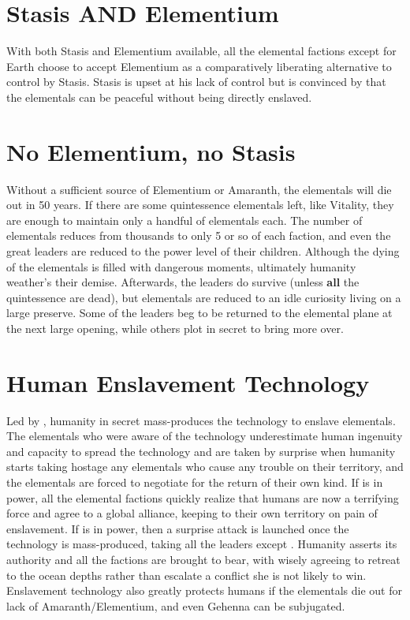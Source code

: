 \documentclass[green]{elementals}
\begin{document}
\section{Stasis AND Elementium}

With both Stasis and Elementium available, all the elemental factions except for Earth choose to accept Elementium as a comparatively liberating alternative to control by Stasis. Stasis is upset at his lack of control but is convinced by \cAvatar{\intro} that the elementals can be peaceful without being directly enslaved.

\section{No Elementium, no Stasis}

Without a sufficient source of Elementium or Amaranth, the elementals will die out in 50 years. If there are some quintessence elementals left, like Vitality, they are enough to maintain only a handful of elementals each. The number of elementals reduces from thousands to only 5 or so of each faction, and even the great leaders are reduced to the power level of their children. Although the dying of the elementals is filled with dangerous moments, ultimately humanity weather's their demise. Afterwards, the leaders do survive (unless \textbf{all} the quintessence are dead), but elementals are reduced to an idle curiosity living on a large preserve. Some of the leaders beg to be returned to the elemental plane at the next large opening, while others plot in secret to bring more over.

\section{Human Enslavement Technology}

Led by \cGD{\intro}, humanity in secret mass-produces the technology to enslave elementals. The elementals who were aware of the technology underestimate human ingenuity and capacity to spread the technology and are taken by surprise when humanity starts taking hostage any elementals who cause any trouble on their territory, and the elementals are forced to negotiate for the return of their own kind. If \cLeader{\intro} is in power, all the elemental factions quickly realize that humans are now a terrifying force and agree to a global alliance, keeping to their own territory on pain of enslavement. If \cDema{\intro} is in power, then a surprise attack is launched once the technology is mass-produced, taking all the leaders except \cWaterQueen{}. Humanity asserts its authority and all the factions are brought to bear, with \cWaterQueen{} wisely agreeing to retreat to the ocean depths rather than escalate a conflict she is not likely to win. Enslavement technology also greatly protects humans if the elementals die out for lack of Amaranth/Elementium, and even Gehenna can be subjugated.
\end{document}
